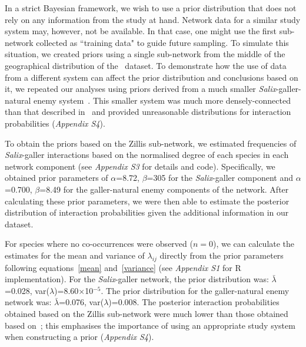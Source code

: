 \documentclass[12pt]{article}
\begin{document}
\begin{spacing}{2.0}
      In a strict Bayesian framework, we wish to use a prior distribution that does not rely on any information from the study at hand. Network data for a similar study system may, however, not be available. In that case, one might use the first sub-network collected as ``training data" to guide future sampling. To simulate this situation, we created priors using a single sub-network from the middle of the geographical distribution of the~\citet{Kopelke2017} dataset. To demonstrate how the use of data from a different system can affect the prior distribution and conclusions based on it, we repeated our analyses using priors derived from a much smaller \emph{Salix}-galler-natural enemy system~\citep[Data available from the Dryad Digital Repository: https://doi.org/10.5061/dryad.g7805]{Barbour2016}\nocite{Barbour2016Dryad}. This smaller system was much more densely-connected than that described in~\citet{Kopelke2017} and provided unreasonable distributions for interaction probabilities (\emph{Appendix S4}). 


      To obtain the priors based on the Zillis sub-network, we estimated frequencies of \emph{Salix}-galler interactions based on the normalised degree of each species in each network component (see \emph{Appendix S3} for details and code). Specifically, we obtained prior parameters of $\alpha$=8.72, $\beta$=305 for the \emph{Salix}-galler component and $\alpha$=0.700, $\beta$=8.49 for the galler-natural enemy components of the network. After calculating these prior parameters, we were then able to estimate the posterior distribution of interaction probabilities given the additional information in our dataset.
  

      For species where no co-occurrences were observed ($n=0$), we can calculate the estimates for the mean and variance of $\lambda_{ij}$ directly from the prior parameters following equations~\ref{mean} and~\ref{variance} (see \emph{Appendix S1} for R implementation). For the \emph{Salix}-galler network, the prior distribution  was: $\bar\lambda$=0.028, var($\lambda$)=8.60$\times$10$^{-5}$. The prior distribution for the galler-natural enemy network was: $\bar\lambda$=0.076, var($\lambda$)=0.008. The posterior interaction probabilities obtained based on the Zillis sub-network were much lower than those obtained based on~\citet[Data available from the Dryad Digital Repository: https://doi.org/10.5061/dryad.g7805]{Barbour2016}; this emphasises the importance of using an appropriate study system when constructing a prior (\emph{Appendix S4}).



\end{spacing}
\end{document}
